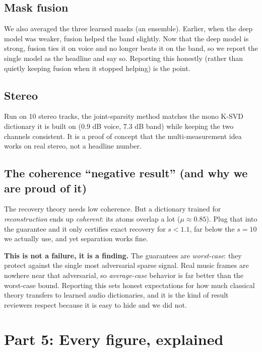 \documentclass[11pt]{article}
\begin{document}
\subsection{Mask fusion}
We also averaged the three learned masks (an ensemble). Earlier, when the deep model
was weaker, fusion helped the band slightly. Now that the deep model is strong,
fusion ties it on voice and no longer beats it on the band, so we report the single
model as the headline and say so. Reporting this honestly (rather than quietly
keeping fusion when it stopped helping) is the point.

\subsection{Stereo}
Run on 10 stereo tracks, the joint-sparsity method matches the mono K-SVD dictionary
it is built on ($0.9$ dB voice, $7.3$ dB band) while keeping the two channels
consistent. It is a proof of concept that the multi-measurement idea works on real
stereo, not a headline number.

\subsection{The coherence ``negative result'' (and why we are proud of it)}
The recovery theory needs low coherence. But a dictionary trained for
\emph{reconstruction} ends up \emph{coherent}: its atoms overlap a lot ($\mu\approx0.85$).
Plug that into the guarantee and it only certifies exact recovery for $s<1.1$, far
below the $s=10$ we actually use, and yet separation works fine.

\begin{keypoint}
\textbf{This is not a failure, it is a finding.} The guarantees are
\emph{worst-case}: they protect against the single most adversarial sparse signal.
Real music frames are nowhere near that adversarial, so \emph{average-case}
behavior is far better than the worst-case bound. Reporting this sets honest
expectations for how much classical theory transfers to learned audio dictionaries,
and it is the kind of result reviewers respect because it is easy to hide and we
did not.
\end{keypoint}

\section{Part 5: Every figure, explained}
\end{document}
